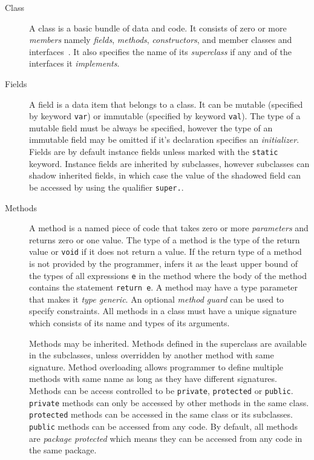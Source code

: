 \begin{description}

\item[Class] A class is a basic bundle of data and code. It consists of zero or
more \emph{members} namely \emph{fields}, \emph{methods}, \emph{constructors},
and member classes and interfaces~\cite{}. It also specifies the name of its
\emph{superclass} if any and of the interfaces it \emph{implements}.  

\item[Fields] A field is a data item that belongs to a class. It can be mutable
(specified by keyword  \texttt{var}) or immutable (specified by keyword
\texttt{val}). The type of a mutable field must be always be specified, however
the type of an immutable field may be omitted if it's declaration specifies an
\emph{initializer}. Fields are by default instance fields unless marked with the
\texttt{static} keyword. Instance fields are inherited by subclasses, however
subclasses can shadow inherited fields, in which case the value of the shadowed
field can be accessed by using the qualifier \texttt{super.}.


\item[Methods] A method is a named piece of code that takes zero or more
\emph{parameters} and returns zero or one value. The type of a method is
the type of the return value or \texttt{void} if it does not return a value.
If the return type of a method is not provided by the programmer, \xten infers
it as the least upper bound of the types of all expressions \texttt{e} in the
method where the body of the method contains the statement \texttt{return e}.
A method may have a type parameter that makes it \emph{type generic}. An
optional \emph{method guard} can be used to specify constraints. All methods in
a class must have a unique signature which consists of its name and types of its
arguments.     

Methods may be inherited. Methods defined in the superclass are available in the
subclasses, unless overridden by another method with same signature. Method
overloading allows programmer to define multiple methods with same name as long
as they have different signatures. Methods can be access controlled to be
\texttt{private}, \texttt{protected} or \texttt{public}. \texttt{private}
methods can only be accessed by other methods in the same class.
\texttt{protected} methods can be accessed in the same class or its subclasses.
\texttt{public} methods can be accessed from any code. By default, all methods
are \emph{package protected} which means they can be accessed from any code in
the same package.


\end{description}
